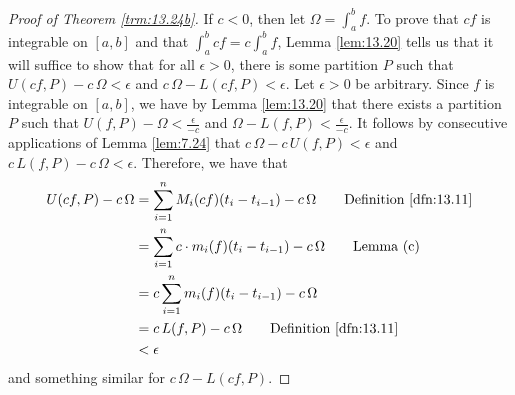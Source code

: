 \documentclass[../main.tex]{subfiles}
\begin{document}
\begin{theorem}
\begin{proof}[Proof of Theorem \ref{trm:13.24b}]
        If $c<0$, then let $\Omega=\int_a^bf$. To prove that $cf$ is integrable on $[a,b]$ and that $\int_a^bcf=c\int_a^bf$, Lemma \ref{lem:13.20} tells us that it will suffice to show that for all $\epsilon>0$, there is some partition $P$ such that $U(cf,P)-c\,\Omega<\epsilon$ and $c\,\Omega-L(cf,P)<\epsilon$. Let $\epsilon>0$ be arbitrary. Since $f$ is integrable on $[a,b]$, we have by Lemma \ref{lem:13.20} that there exists a partition $P$ such that $U(f,P)-\Omega<\frac{\epsilon}{-c}$ and $\Omega-L(f,P)<\frac{\epsilon}{-c}$. It follows by consecutive applications of Lemma \ref{lem:7.24} that $c\,\Omega-c\, U(f,P)<\epsilon$ and $c\, L(f,P)-c\,\Omega<\epsilon$. Therefore, we have that
        \begin{align*}
            U(cf,P)-c\,\Omega &= \sum_{i=1}^nM_i(cf)(t_i-t_{i-1})-c\,\Omega\tag*{Definition \ref{dfn:13.11}}\\
            &= \sum_{i=1}^nc\cdot m_i(f)(t_i-t_{i-1})-c\,\Omega\tag*{Lemma (c)}\\
            &= c\sum_{i=1}^nm_i(f)(t_i-t_{i-1})-c\,\Omega\\
            &= c\, L(f,P)-c\,\Omega\tag*{Definition \ref{dfn:13.11}}\\
            &< \epsilon
        \end{align*}
        and something similar for $c\,\Omega-L(cf,P)$.
    \end{proof}
\end{theorem}
\end{document}
